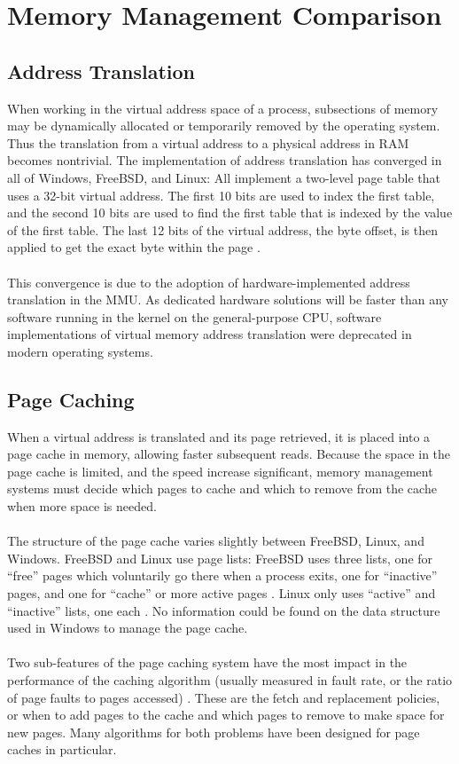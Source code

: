 \documentclass[10pt,draftclsnofoot,onecolumn]{article}
\begin{document}
\section{Memory Management Comparison}

\subsection{Address Translation}

When working in the virtual address space of a process, subsections of memory may be dynamically allocated or temporarily removed by the operating system. Thus the translation from a virtual address to a physical address in RAM becomes nontrivial. The implementation of address translation has converged in all of Windows, FreeBSD, and Linux: All implement a two-level page table that uses a 32-bit virtual address. The first 10 bits are used to index the first table, and the second 10 bits are used to find the first table that is indexed by the value of the first table. The last 12 bits of the virtual address, the byte offset, is then applied to get the exact byte within the page \cite{BSDM, Wandos, Loonix}.
\\\\
This convergence is due to the adoption of hardware-implemented address translation in the MMU. As dedicated hardware solutions will be faster than any software running in the kernel on the general-purpose CPU, software implementations of virtual memory address translation were deprecated in modern operating systems.

\subsection{Page Caching}

When a virtual address is translated and its page retrieved, it is placed into a page cache in memory, allowing faster subsequent reads. Because the space in the page cache is limited, and the speed increase significant, memory management systems must decide which pages to cache and which to remove from the cache when more space is needed. 
\\\\
The structure of the page cache varies slightly between FreeBSD, Linux, and Windows. FreeBSD and Linux use page lists: FreeBSD uses three lists, one for “free” pages which voluntarily go there when a process exits, one for “inactive” pages, and one for “cache” or more active pages \cite{BSDM}. Linux only uses “active” and “inactive” lists, one each \cite{Loonix}. No information could be found on the data structure used in Windows to manage the page cache.
\\\\
Two sub-features of the page caching system have the most impact in the performance of the caching algorithm (usually measured in fault rate, or the ratio of page faults to pages accessed) \cite{BSDM}. These are the fetch and replacement policies, or when to add pages to the cache and which pages to remove to make space for new pages. Many algorithms for both problems have been designed for page caches in particular. 
\end{document}

